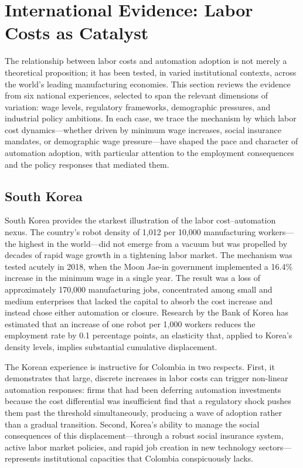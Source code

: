\section{International Evidence: Labor Costs as Catalyst}
\label{sec:international}

The relationship between labor costs and automation adoption is not merely a theoretical proposition; it has been tested, in varied institutional contexts, across the world's leading manufacturing economies. This section reviews the evidence from six national experiences, selected to span the relevant dimensions of variation: wage levels, regulatory frameworks, demographic pressures, and industrial policy ambitions. In each case, we trace the mechanism by which labor cost dynamics---whether driven by minimum wage increases, social insurance mandates, or demographic wage pressure---have shaped the pace and character of automation adoption, with particular attention to the employment consequences and the policy responses that mediated them.

\subsection{South Korea}
\label{subsec:korea}

South Korea provides the starkest illustration of the labor cost--automation nexus. The country's robot density of 1,012 per 10,000 manufacturing workers---the highest in the world---did not emerge from a vacuum but was propelled by decades of rapid wage growth in a tightening labor market. The mechanism was tested acutely in 2018, when the Moon Jae-in government implemented a 16.4\% increase in the minimum wage in a single year. The result was a loss of approximately 170,000 manufacturing jobs, concentrated among small and medium enterprises that lacked the capital to absorb the cost increase and instead chose either automation or closure. Research by the Bank of Korea has estimated that an increase of one robot per 1,000 workers reduces the employment rate by 0.1 percentage points, an elasticity that, applied to Korea's density levels, implies substantial cumulative displacement.

The Korean experience is instructive for Colombia in two respects. First, it demonstrates that large, discrete increases in labor costs can trigger non-linear automation responses: firms that had been deferring automation investments because the cost differential was insufficient find that a regulatory shock pushes them past the threshold simultaneously, producing a wave of adoption rather than a gradual transition. Second, Korea's ability to manage the social consequences of this displacement---through a robust social insurance system, active labor market policies, and rapid job creation in new technology sectors---represents institutional capacities that Colombia conspicuously lacks.

